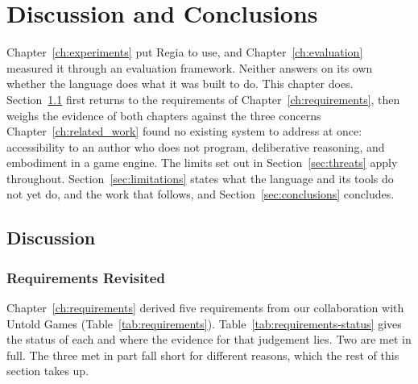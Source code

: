\chapter{Discussion and Conclusions}
\label{ch:discussion}

Chapter~\ref{ch:experiments} put Regia to use, and Chapter~\ref{ch:evaluation} measured it through an evaluation framework. Neither answers on its own whether the language does what it was built to do. This chapter does. Section~\ref{sec:discussion} first returns to the requirements of Chapter~\ref{ch:requirements}, then weighs the evidence of both chapters against the three concerns Chapter~\ref{ch:related_work} found no existing system to address at once: accessibility to an author who does not program, deliberative reasoning, and embodiment in a game engine. The limits set out in Section~\ref{sec:threats} apply throughout. Section~\ref{sec:limitations} states what the language and its tools do not yet do, and the work that follows, and Section~\ref{sec:conclusions} concludes.

\section{Discussion}
\label{sec:discussion}
 
\subsection{Requirements Revisited}
\label{sec:requirements-revisited}
 
Chapter~\ref{ch:requirements} derived five requirements from our collaboration with Untold Games (Table~\ref{tab:requirements}). Table~\ref{tab:requirements-status} gives the status of each and where the evidence for that judgement lies. Two are met in full. The three met in part fall short for different reasons, which the rest of this section takes up.
 
